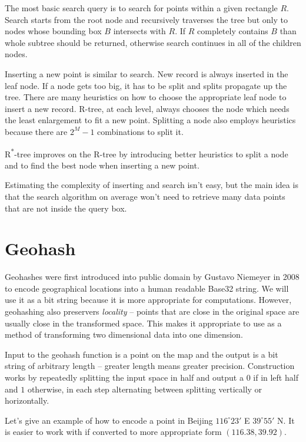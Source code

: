 \documentclass[times, utf8, diplomski]{fer}
\newcommand{\rstar}{R\textsuperscript{*}}
\begin{document}
The most basic search query is to search for points within a given rectangle $R$. Search starts from the root node and recursively traverses the tree but only to nodes whose bounding box $B$ intersects with $R$. If $R$ completely contains $B$ than whole subtree should be returned, otherwise search continues in all of the children nodes.

Inserting a new point is similar to search. New record is always inserted in the leaf node. If a node gets too big, it has to be split and splits propagate up the tree. There are many heuristics on how to choose the appropriate leaf node to insert a new record. R-tree, at each level, always chooses the node which needs the least enlargement to fit a new point. Splitting a node also employs heuristics because there are $2^M-1$ combinations to split it.

\rstar-tree improves on the R-tree by introducing better heuristics to split a node and to find the best node when inserting a new point.

Estimating the complexity of inserting and search isn't easy, but the main idea is that the search algorithm on average won't need to retrieve many data points that are not inside the query box. 

\section{Geohash} \label{geohashing}
Geohashes were first introduced into public domain by Gustavo Niemeyer in 2008 \cite{spatiotemporal} to encode geographical locations into a human readable Base32 string. We will use it as a bit string because it is more appropriate for computations. However, geohashing also preservers \emph{locality} -- points that are close in the original space are usually close in the transformed space. This makes it appropriate to use as a method of transforming two dimensional data into one dimension.

Input to the geohash function is a point on the map and the output is a bit string of arbitrary length -- greater length means greater precision. Construction works by repeatedly splitting the input space in half and output a $0$ if in left half and $1$ otherwise, in each step alternating between splitting vertically or horizontally.

Let's give an example of how to encode a point in Beijing $116^{\circ}23'$ E $39^{\circ}55'$ N. It is easier to work with if converted to more appropriate form $(116.38, 39.92)$. 
\end{document}
